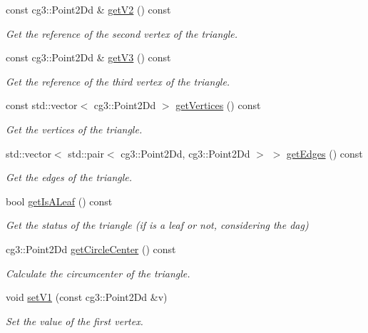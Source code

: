 \begin{DoxyCompactItemize}
const cg3\+::\+Point2\+Dd \& \hyperlink{classTriangle_afd1afc04804cd49af6bf81c162b8c984}{get\+V2} () const
\begin{DoxyCompactList}\small\item\em Get the reference of the second vertex of the triangle. \end{DoxyCompactList}\item 
const cg3\+::\+Point2\+Dd \& \hyperlink{classTriangle_abe96c8ea9aaf52e921b9e6420a5d6a35}{get\+V3} () const
\begin{DoxyCompactList}\small\item\em Get the reference of the third vertex of the triangle. \end{DoxyCompactList}\item 
const std\+::vector$<$ cg3\+::\+Point2\+Dd $>$ \hyperlink{classTriangle_aba56c2fbfb76c584343eef793e437bb7}{get\+Vertices} () const
\begin{DoxyCompactList}\small\item\em Get the vertices of the triangle. \end{DoxyCompactList}\item 
std\+::vector$<$ std\+::pair$<$ cg3\+::\+Point2\+Dd, cg3\+::\+Point2\+Dd $>$ $>$ \hyperlink{classTriangle_a0b67c787d0d6e2fcf38da1d534463e41}{get\+Edges} () const
\begin{DoxyCompactList}\small\item\em Get the edges of the triangle. \end{DoxyCompactList}\item 
bool \hyperlink{classTriangle_a92fb8b4f8ac36287416f61ae9a1065b4}{get\+Is\+A\+Leaf} () const
\begin{DoxyCompactList}\small\item\em Get the status of the triangle (if is a leaf or not, considering the dag) \end{DoxyCompactList}\item 
cg3\+::\+Point2\+Dd \hyperlink{classTriangle_a0889cfdbbf72330793f0b4327a335c2b}{get\+Circle\+Center} () const
\begin{DoxyCompactList}\small\item\em Calculate the circumcenter of the triangle. \end{DoxyCompactList}\item 
void \hyperlink{classTriangle_a419907b86c91c0b35fcbcfb1f8c96844}{set\+V1} (const cg3\+::\+Point2\+Dd \&v)
\begin{DoxyCompactList}\small\item\em Set the value of the first vertex. \end{DoxyCompactList}\item 

\end{DoxyCompactItemize}
